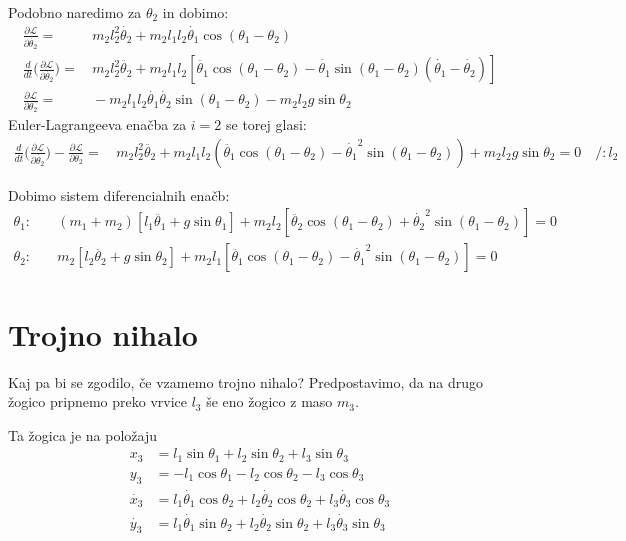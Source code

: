 \documentclass[a4paper,11pt]{article}
\begin{document}
Podobno naredimo za $\theta_2$ in dobimo:
\begin{align*}
    \frac{\partial \mathcal{L}}{\partial \dot{\theta_2}} =& \, m_2 l_2^2 \dot{\theta_2} + m_2 l_1 l_2 \dot{\theta_1} \cos(\theta_1 - \theta_2)\\
    \frac{d}{dt} \Big(\frac{\partial \mathcal{L}}{\partial \dot{\theta_2}}\Big) =& \, m_2 l_2^2 \ddot{\theta_2} + m_2 l_1 l_2 [\ddot{\theta_1} \cos(\theta_1 - \theta_2) - \dot{\theta_1} \sin (\theta_1 - \theta_2)(\dot{\theta_1} - \dot{\theta_2})]\\
    \frac{\partial \mathcal{L}}{\partial \theta_2}=& \, -m_2 l_1 l_2 \dot{\theta_1} \dot{\theta_2} \sin(\theta_1 - \theta_2) - m_2 l_2 g \sin \theta_2
\end{align*}
Euler-Lagrangeeva enačba za $i=2$ se torej glasi:
\begin{align*}
    \frac{d}{dt} \Big(\frac{\partial \mathcal{L}}{\partial \dot{\theta_2}}\Big) - \frac{\partial \mathcal{L}}{\partial \theta_2} =& \, m_2 l_2^2 \ddot{\theta_2} + m_2 l_1 l_2 (\ddot{\theta_1} \cos(\theta_1 - \theta_2) - \dot{\theta_1}^2 \sin (\theta_1 - \theta_2)) + m_2l_2 g \sin \theta_2 =0 \quad /:l_2
\end{align*}

Dobimo sistem diferencialnih enačb:
\begin{align*}
    \theta_1: &\quad (m_1 + m_2)[l_1 \ddot{\theta_1} + g \sin \theta_1] + m_2 l_2 [\ddot{\theta_2} \cos(\theta_1 - \theta_2) + \dot{\theta_2}^2 \sin(\theta_1-\theta_2)] = 0\\
    \theta_2: &\quad m_2 [l_2 \ddot{\theta_2} + g \sin \theta_2] + m_2 l_1 [\ddot{\theta_1} \cos(\theta_1 - \theta_2) - \dot{\theta_1}^2 \sin(\theta_1 - \theta_2)] =0
\end{align*}

\section{Trojno nihalo}
Kaj pa bi se zgodilo, če vzamemo trojno nihalo? Predpostavimo, da na drugo žogico pripnemo preko vrvice $l_3$ še eno žogico z maso $m_3$.

Ta žogica je na položaju 
\begin{align*}
    x_3 &= l_1 \sin\theta_1 + l_2 \sin \theta_2 + l_3 \sin \theta_3\\
    y_3 &= - l_1 \cos \theta_1 - l_2 \cos \theta_2 - l_3 \cos \theta_3\\
    \dot{x_3} &= l_1 \dot{\theta_1} \cos \theta_2 + l_2 \dot{\theta_2} \cos \theta_2 + l_3 \dot{\theta_3} \cos \theta_3\\
    \dot{y_3} &= l_1 \dot{\theta_1} \sin \theta_2 + l_2 \dot{\theta_2} \sin \theta_2 + l_3 \dot{\theta_3} \sin \theta_3
\end{align*}
\end{document}
